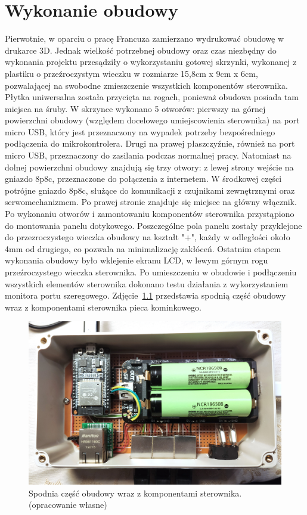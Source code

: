 \documentclass[11pt]{report}
\begin{document}
 \chapter{Wykonanie obudowy}\label{ch:obudowa}
 Pierwotnie, w oparciu o pracę Francuza \cite{Frence2014} zamierzano wydrukować obudowę w  drukarce 3D. Jednak wielkość potrzebnej obudowy oraz czas niezbędny do wykonania projektu przesądziły o wykorzystaniu gotowej skrzynki, wykonanej z plastiku o przeźroczystym wieczku w rozmiarze 15,8cm x 9cm x 6cm, pozwalającej na swobodne zmieszczenie wszystkich komponentów sterownika. Płytka uniwersalna została przycięta na rogach, ponieważ obudowa posiada tam miejsca na śruby. W skrzynce wykonano 5 otworów: pierwszy na górnej powierzchni obudowy (względem docelowego umiejscowienia sterownika) na port micro USB, który jest przeznaczony na wypadek potrzeby bezpośredniego podłączenia do mikrokontrolera. Drugi na prawej płaszczyźnie, również na port micro USB, przeznaczony do zasilania podczas normalnej pracy. Natomiast na dolnej powierzchni obudowy znajdują się trzy otwory: z lewej strony wejście na gniazdo 8p8c, przeznaczone do połączenia z internetem. W środkowej części potrójne gniazdo 8p8c, służące do komunikacji z czujnikami zewnętrznymi oraz serwomechanizmem. Po prawej stronie znajduje się miejsce na główny włącznik.
 Po wykonaniu otworów i zamontowaniu komponentów sterownika przystąpiono do montowania panelu dotykowego. Poszczególne pola panelu zostały przyklejone do przezroczystego wieczka obudowy na kształt "+", każdy w odległości około 4mm od drugiego, co pozwala na minimalizację zakłóceń.
 Ostatnim etapem wykonania obudowy było wklejenie ekranu LCD, w lewym górnym rogu przeźroczystego wieczka sterownika.
 Po umieszczeniu w obudowie i podłączeniu wszystkich elementów sterownika dokonano testu działania z wykorzystaniem monitora portu szeregowego.
   Zdjęcie~\ref{fig:wnetrze} przedstawia spodnią część obudowy wraz z komponentami sterownika pieca kominkowego.
\begin{figure}[ht]
\centering
\includegraphics[width=0.8 \textwidth]{fig/wnetrze.jpg}
\caption{Spodnia część obudowy wraz z komponentami sterownika. (opracowanie własne)}
\label{fig:wnetrze}
\end{figure}
 
\end{document}
